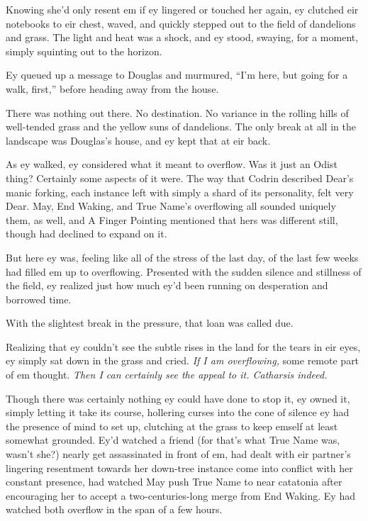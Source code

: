 Knowing she'd only resent em if ey lingered or touched her again, ey clutched eir notebooks to eir chest, waved, and quickly stepped out to the field of dandelions and grass. The light and heat was a shock, and ey stood, swaying, for a moment, simply squinting out to the horizon.

Ey queued up a message to Douglas and murmured, ``I'm here, but going for a walk, first,'' before heading away from the house.

There was nothing out there. No destination. No variance in the rolling hills of well-tended grass and the yellow suns of dandelions. The only break at all in the landscape was Douglas's house, and ey kept that at eir back.

As ey walked, ey considered what it meant to overflow. Was it just an Odist thing? Certainly some aspects of it were. The way that Codrin described Dear's manic forking, each instance left with simply a shard of its personality, felt very Dear. May, End Waking, and True Name's overflowing all sounded uniquely them, as well, and A Finger Pointing mentioned that hers was different still, though had declined to expand on it.

But here ey was, feeling like all of the stress of the last day, of the last few weeks had filled em up to overflowing. Presented with the sudden silence and stillness of the field, ey realized just how much ey'd been running on desperation and borrowed time.

With the slightest break in the pressure, that loan was called due.

Realizing that ey couldn't see the subtle rises in the land for the tears in eir eyes, ey simply sat down in the grass and cried. \emph{If I am overflowing,} some remote part of em thought. \emph{Then I can certainly see the appeal to it. Catharsis indeed.}

Though there was certainly nothing ey could have done to stop it, ey owned it, simply letting it take its course, hollering curses into the cone of silence ey had the presence of mind to set up, clutching at the grass to keep emself at least somewhat grounded. Ey'd watched a friend (for that's what True Name was, wasn't she?) nearly get assassinated in front of em, had dealt with eir partner's lingering resentment towards her down-tree instance come into conflict with her constant presence, had watched May push True Name to near catatonia after encouraging her to accept a two-centuries-long merge from End Waking. Ey had watched both overflow in the span of a few hours.

